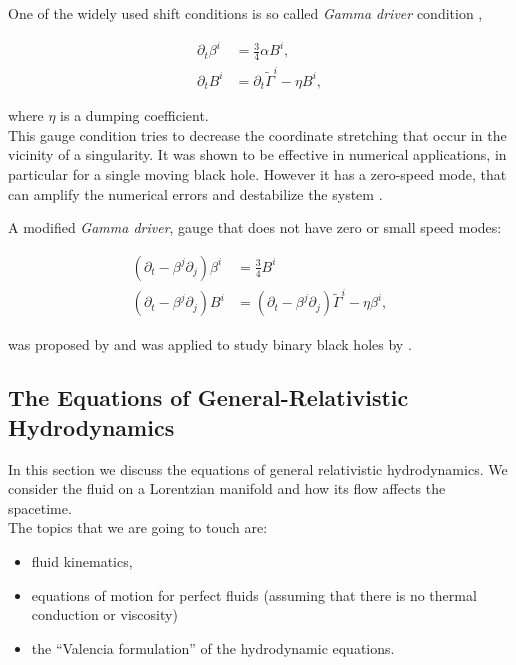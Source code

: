 \documentclass[11pt,a4paper,headinclude=true,DIV=14,BCOR=8mm,chapterprefix,listof=totoc,twoside,openright,abstracton]{scrbook}
\begin{document}
One of the widely used shift conditions is so called \textit{Gamma driver} condition \cite{Alcubierre:2002kk}, 

\begin{align}
    \partial_t\beta^i &= \frac{3}{4}\alpha B^i, \\
    \partial_t B^i &= \partial_t\widetilde{\Gamma}^i - \eta B^i,
\end{align}

where $\eta$ is a dumping coefficient. \\

This gauge condition tries to decrease the coordinate stretching that occur in the vicinity of a singularity. It was shown to be effective in numerical applications, in particular for a single moving black hole. However it has a zero-speed mode, that can amplify the numerical errors and destabilize the system \cite{vanMeter:2006vi}.

A modified \textit{Gamma driver}, gauge that does not have zero or small speed modes:

\begin{align}
    (\partial_t - \beta^j\partial_j)\beta^i &= \frac{3}{4}B^i \\
    (\partial_t - \beta^j\partial_j)B^i &= (\partial_t - \beta^j\partial_j)\widetilde{\Gamma}^i-\eta\beta^i,
\end{align}

was proposed by \cite{vanMeter:2006vi} and was applied to study binary black holes by \cite{Campanelli:2005dd}.

\subsection{The Equations of General-Relativistic Hydrodynamics}

In this section we discuss the equations of general relativistic hydrodynamics. We consider the fluid on a Lorentzian manifold and how its flow affects the spacetime. \\ 

The topics that we are going to touch are:
\begin{itemize}
    \item fluid kinematics,
    \item equations of motion for perfect fluids (assuming that there is no thermal conduction or viscosity)
    \item the “Valencia formulation” of the hydrodynamic equations.
\end{itemize}
\end{document}
